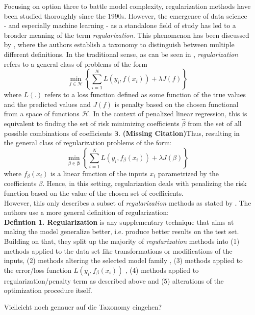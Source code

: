 \documentclass[12pt,a4paper]{article}
\newenvironment{lightbluebox}{%
    \begin{tcolorbox}[colback=lightblue, colframe=lightblue, fontupper=\itshape]%
}{%
    \end{tcolorbox}%
}
\newcommand{\MC}{\textbf{(Missing Citation)}} %
\begin{document}
Focusing on option three to battle model complexity, regularization methods have been studied thoroughly since the 1990s. However, the emergence of data science - and especially machine learning - as a standalone field of study has led to a broader meaning of the term \textit{regularization}. This phenomenon has been discussed by \textcite{Taxonomy2017}, where the authors establish a taxonomy to distinguish between multiple different definitions. In the traditional sense, as can be seen in \textcite[167--170]{ESL2009}, \textit{regularization} refers to a general class of problems of the form
\[
\underset{f \in \mathcal{H}}{\min}\left\{\sum_{i=1}^N L(y_i, f(x_i)) + \lambda{J}(f)\right\}
\]
where $L(.)$ refers to a loss function defined as some function of the true values and the predicted values and $J(f)$ is penalty based on the chosen functional from a space of functions $\mathcal{H}$. In the context of penalized linear regression, this is equivalent to finding the set of risk minimizing coefficients $\hat{\beta}$ from the set of all possible combinations of coefficients $\boldsymbol{\beta}$. \MC Thus, resulting in the general class of regularization problems of the form:
\[
\underset{\beta \in \boldsymbol{\beta}}{\min}\left\{\sum_{i=1}^N L(y_i, f_\beta(x_i)) + \lambda{J}(\beta)\right\}
\]
where $f_\beta(x_i)$ is a linear function of the inputs $x_i$ parametrized by the coefficients $\beta$. Hence, in this setting, regularization deals with penalizing the risk function based on the value of the chosen set of coefficients. \\
However, this only describes a subset of \textit{regularization} methods as stated by \textcite{Taxonomy2017}. The authors use a more general definition of regularization:\\

\textbf{Defintion 1. Regularization} is any supplementary technique that aims at making the model generalize better, i.e. produce better results on the test set.\\

Building on that, they split up the majority of \textit{regularization} methods into  (1) methods applied to the data set like transformations or modifications of the inputs, (2) methods altering the selected model family , (3) methods applied to the error/loss function $L(y_i, f_\beta(x_i))$ , (4) methods applied to regularization/penalty term as described above and (5) alterations of the optimization procedure itself. 

\begin{lightbluebox}
Vielleicht noch genauer auf die Taxonomy eingehen? 
\end{lightbluebox} 
\end{document}
